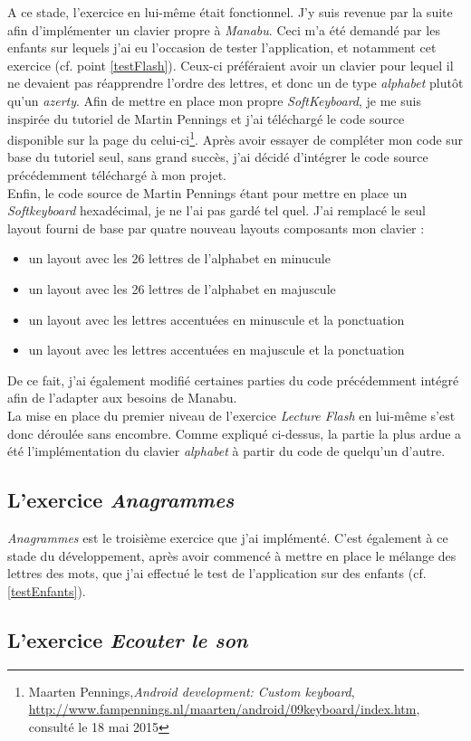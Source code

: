 A ce stade, l'exercice en lui-même était fonctionnel. J'y suis revenue par la suite afin d'implémenter un clavier propre à \textit{Manabu}. Ceci m'a été demandé par les enfants sur lequels j'ai eu l'occasion de tester l'application, et notamment cet exercice (cf. point \ref{testFlash}). Ceux-ci préféraient avoir un clavier pour lequel il ne devaient pas réapprendre l'ordre des lettres, et donc un de type \textit{alphabet} plutôt qu'un \textit{azerty}. Afin de mettre en place mon propre \textit{SoftKeyboard}, je me suis inspirée du tutoriel de Martin Pennings et j'ai téléchargé le code source disponible sur la page du celui-ci\footnote{Maarten Pennings,\textit{Android development: Custom keyboard}, \url{http://www.fampennings.nl/maarten/android/09keyboard/index.htm}, consulté le 18 mai 2015}. Après avoir essayer de compléter mon code sur base du tutoriel seul, sans grand succès, j'ai décidé d'intégrer le code source précédemment téléchargé à mon projet.\\

Enfin, le code source de Martin Pennings étant pour mettre en place un \textit{Softkeyboard} hexadécimal, je ne l'ai pas gardé tel quel. J'ai remplacé le seul layout fourni de base par quatre nouveau layouts composants mon clavier :
\begin{itemize}
\item un layout avec les 26 lettres de l'alphabet en minucule
\item un layout avec les 26 lettres de l'alphabet en majuscule
\item un layout avec les lettres accentuées en minuscule et la ponctuation
\item un layout avec les lettres accentuées en majuscule et la ponctuation
\end{itemize}
De ce fait, j'ai également modifié certaines parties du code précédemment intégré afin de l'adapter aux besoins de Manabu.\\

La mise en place du premier niveau de l'exercice \textit{Lecture Flash} en lui-même s'est donc déroulée sans encombre. Comme expliqué ci-dessus, la partie la plus ardue a été l'implémentation du clavier \textit{alphabet} à partir du code de quelqu'un d'autre.
	
\subsection{L'exercice \textit{Anagrammes}}
\textit{Anagrammes} est le troisième exercice que j'ai implémenté. C'est également à ce stade du développement, après avoir commencé à mettre en place le mélange des lettres des mots, que j'ai effectué le test de l'application sur des enfants (cf. \ref{testEnfants}).

\subsection{L'exercice \textit{Ecouter le son}}
